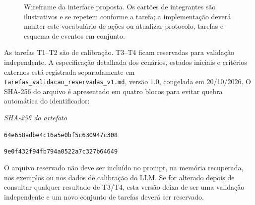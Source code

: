 \documentclass[conference]{IEEEtran}
\begin{document}
\begin{figure}[!t]
\caption{Wireframe da interface proposta. Os cartões de integrantes são ilustrativos e se repetem conforme a tarefa; a implementação deverá manter este vocabulário de ações ou atualizar protocolo, tarefas e esquema de eventos em conjunto.}
\label{fig:wireframe}
\end{figure}


As tarefas T1--T2 são de calibração. T3--T4 ficam reservadas para validação independente. A especificação detalhada dos cenários, estados iniciais e critérios externos está registrada separadamente em \texttt{Tarefas\_validacao\_reservadas\_v1.md}, versão 1.0, congelada em 20/10/2026. O SHA-256 do arquivo é apresentado em quatro blocos para evitar quebra automática do identificador:
\begin{center}
\small
\textit{SHA-256 do artefato}\par
\texttt{64e658adbe4c16a5e0bf5c630947c308}\par
\texttt{9e0f432f94fb794a0522a7c327b64649}
\end{center}
O arquivo reservado não deve ser incluído no prompt, na memória recuperada, nos exemplos ou nos dados de calibração do LLM. Se for alterado depois de consultar qualquer resultado de T3/T4, esta versão deixa de ser uma validação independente e um novo conjunto de tarefas deverá ser reservado.
\end{document}
